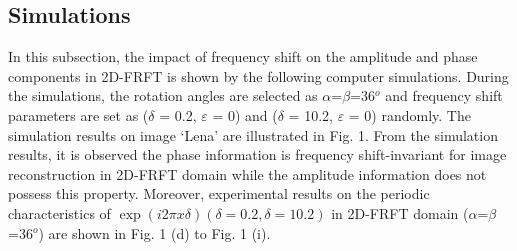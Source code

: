 \documentclass[journal]{IEEEtran}
\begin{document}
\subsection{Simulations}
In this subsection, the impact of frequency shift on the amplitude and phase components in 2D-FRFT is shown by the following computer simulations. During the simulations, the rotation angles are selected as $\alpha$=$\beta$=36$^o$ and frequency shift parameters are set as ($\delta$ = 0.2, $\varepsilon$ = 0) and ($\delta$ = 10.2, $\varepsilon$ = 0) randomly. The simulation results on image `Lena' are illustrated in Fig. 1. From the simulation results, it is observed the phase information is frequency shift-invariant for image reconstruction in 2D-FRFT domain while the amplitude information does not possess this property. Moreover, experimental results on the periodic characteristics of $ \exp (i2\pi x\delta )  (\delta =0.2, \delta =10.2)$ in 2D-FRFT domain ($\alpha$=$\beta$=36$^o$) are shown in Fig. 1 (d) to Fig. 1 (i).
\end{document}

